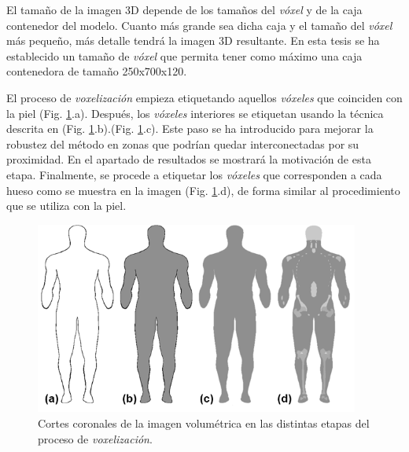 El tamaño de la imagen 3D depende de los tamaños del \emph{vóxel} y de la caja contenedor del modelo. Cuanto más grande sea dicha caja y el tamaño del \emph{vóxel} más pequeño, más detalle tendrá la imagen 3D resultante. %
En esta tesis se ha establecido un tamaño de \emph{vóxel} que permita tener como máximo una caja contenedora de tamaño 250x700x120.

El proceso de \emph{voxelización} empieza etiquetando aquellos \emph{vóxeles} que coinciden con la piel (Fig. \ref{fig:voxelizacion}.a). Después, los \emph{vóxeles} interiores se etiquetan usando la técnica descrita en \cite{SUZUKI20031} (Fig. \ref{fig:voxelizacion}.b).(Fig. \ref{fig:voxelizacion}.c). Este paso se ha introducido para mejorar la robustez del método en zonas que podrían quedar interconectadas por su proximidad. En el apartado de resultados se mostrará la motivación de esta etapa. Finalmente, se procede a etiquetar los \emph{vóxeles} que corresponden a cada hueso como se muestra en la imagen (Fig. \ref{fig:voxelizacion}.d), de forma similar al procedimiento que se utiliza con la piel. 
%
%
\begin{figure}[th]
   \centering
    \includegraphics[width=0.95\textwidth]{IMG/Volume2.png}
    \caption{
    Cortes coronales de la imagen volumétrica en las distintas etapas del proceso de \emph{voxelización}.}
\label{fig:voxelizacion}
\end{figure}

